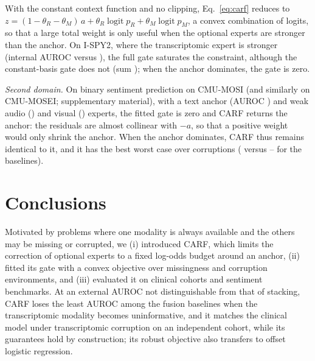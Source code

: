 \documentclass[runningheads]{llncs}
\newcommand{\logit}{\operatorname{logit}}
\begin{document}
With the constant context function and no clipping, Eq.~\eqref{eq:carf} reduces to $z=(1-\theta_R-\theta_M)\,a+\theta_R\logit p_R+\theta_M\logit p_M$, a convex combination of logits, so that a large total weight is only useful when the optional experts are stronger than the anchor. On I-SPY2, where the transcriptomic expert is stronger (internal AUROC \IntRna{} versus \IntClin{}), the full gate saturates the constraint, although the constant-basis gate does not (sum \NoContextCoefSum{}); when the anchor dominates, the gate is zero.

\emph{Second domain.} On binary sentiment prediction on CMU-MOSI \cite{zadeh2016mosi} (and similarly on CMU-MOSEI; supplementary material), with a text anchor (AUROC \MosiText{}) and weak audio (\MosiAudio{}) and visual (\MosiVisual{}) experts, the fitted gate is zero and CARF returns the anchor: the residuals are almost collinear with $-a$, so that a positive weight would only shrink the anchor. When the anchor dominates, CARF thus remains identical to it, and it has the best worst case over \MosiNScen{} corruptions (\MosiWorstCarf{} versus \MosiWorstBaseLo{}--\MosiWorstBaseHi{} for the baselines).

\section{Conclusions}

Motivated by problems where one modality is always available and the others may be missing or corrupted, we (i) introduced CARF, which limits the correction of optional experts to a fixed log-odds budget around an anchor, (ii) fitted its gate with a convex objective over missingness and corruption environments, and (iii) evaluated it on clinical cohorts and sentiment benchmarks. At an external AUROC not distinguishable from that of stacking, CARF loses the least AUROC among the fusion baselines when the transcriptomic modality becomes uninformative, and it matches the clinical model under transcriptomic corruption on an independent cohort, while its guarantees hold by construction; its robust objective also transfers to offset logistic regression.
\end{document}
